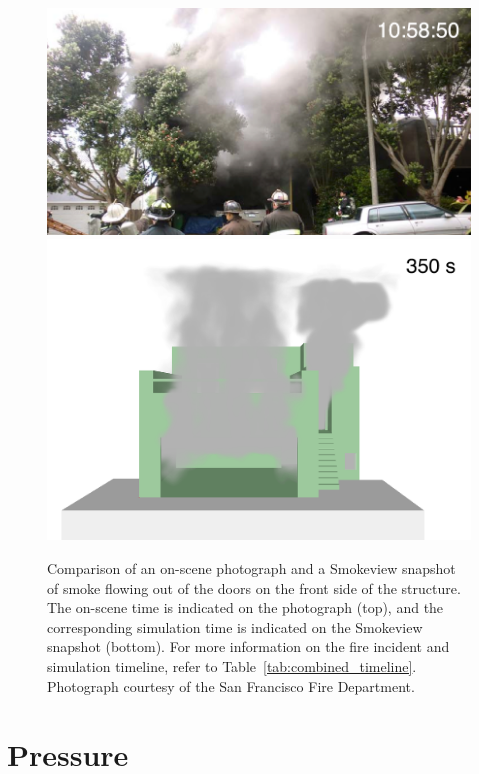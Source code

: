 \documentclass[12pt,oneside]{book}
\begin{document}
\begin{figure}[!ht]
\includegraphics[width=5.0in]{../Figures/Photo_Front_350_s}
\includegraphics[width=5.0in]{../Figures/SMV_Front_350_s}
\caption[Snapshot of smoke flowing out of the doors on the front side of the structure.]
{Comparison of an on-scene photograph and a Smokeview snapshot of smoke flowing out of the doors on the front side of the structure. The on-scene time is indicated on the photograph (top), and the corresponding simulation time is indicated on the Smokeview snapshot (bottom). For more information on the fire incident and simulation timeline, refer to Table~\ref{tab:combined_timeline}. Photograph courtesy of the San Francisco Fire Department.}
\label{fig:timeline_comparison_front}
\end{figure}


\clearpage


\section{Pressure}
\label{sec:pressure}
\end{document}
